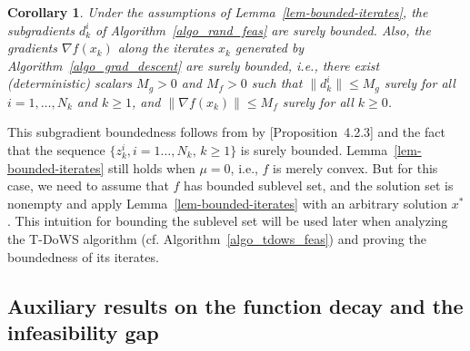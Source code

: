 \documentclass{article}
\theoremstyle{plain}
\newtheorem{corollary}[theorem]{Corollary}
\theoremstyle{definition}
\theoremstyle{remark}
\begin{document}
\begin{corollary}\label{cor_subgrad_bound}
Under the assumptions of Lemma~\ref{lem-bounded-iterates},
the subgradients $d_k^i$ of Algorithm~\ref{algo_rand_feas} are surely bounded. Also, the gradients $\nabla f(x_k)$ along the iterates $x_k$ generated by Algorithm~\ref{algo_grad_descent} are surely bounded, i.e., there exist (deterministic) scalars $M_g>0$ and $M_f>0$ such that $\| d_k^i \| \leq M_g$ surely for all $i=1,\ldots,N_k$ and $k\ge 1$, and $\|\nabla f(x_k) \| \leq M_f$ surely for all $k\ge0$.
\end{corollary}
This subgradient boundedness follows from by \cite{bertsekas2003convex}[Proposition~4.2.3]
and the fact that 
the sequence $\{z_k^i, i=1\ldots, N_k, \, k\ge 1\}$
is surely bounded. Lemma~\ref{lem-bounded-iterates} still holds when $\mu = 0$, i.e., $f$ is merely convex. But for this case, we need to assume that $f$ has bounded sublevel set, and the solution set is nonempty and apply Lemma~\ref{lem-bounded-iterates} with an arbitrary solution $x^*$. This intuition for bounding the sublevel set will be used later when analyzing the T-DoWS algorithm (cf. Algorithm~\ref{algo_tdows_feas}) and proving the boundedness of its iterates.


\subsection{Auxiliary results on the function decay and the infeasibility gap}\label{thm_sc_conv_proof}
\end{document}
